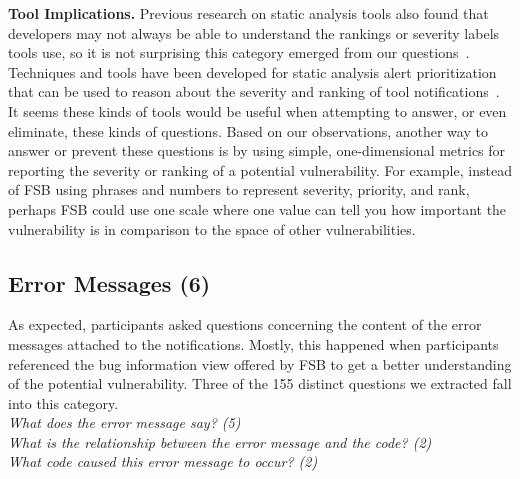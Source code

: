 \documentclass[conference]{IEEEtran}
\begin{document}
\noindent\textbf{Tool Implications.}
Previous research on static analysis tools also found that developers may not always be able to understand the rankings or severity labels tools use, so it is not surprising this category emerged from our questions~\cite{johnson2013don}.
Techniques and tools have been developed for static analysis alert prioritization that can be used to reason about the severity and ranking of tool notifications~\cite{kim2007prioritizing, boogerd2006prioritizing, kremenek2004correlation}.
It seems these kinds of tools would be useful when attempting to answer, or even eliminate, these kinds of questions. 
Based on our observations, another way to answer or prevent these questions is by using simple, one-dimensional metrics for reporting the severity or ranking of a potential vulnerability.
For example, instead of FSB using phrases and numbers to represent severity, priority, and rank, perhaps FSB could use one scale where one value can tell you how important the vulnerability is in comparison to the space of other vulnerabilities.


\noindent\subsection{\textbf{Error Messages (6)}}\label{em}

As expected, participants asked questions concerning the content of the error messages attached to the notifications. 
Mostly, this happened when participants referenced the bug information view offered by FSB to get a better understanding of the potential vulnerability.
Three of the 155 distinct questions we extracted fall into this category.
\\

\noindent\emph{What does the error message say? (5)} \\
\emph{What is the relationship between the error message and the code? (2)} \\
\emph{What code caused this error message to occur? (2)} \\
\end{document}
